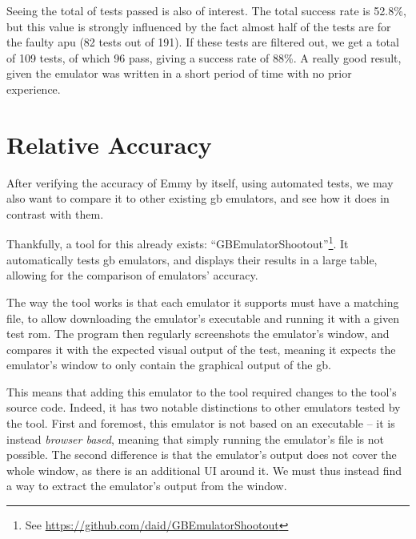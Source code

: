 \documentclass[11pt]{informatics-report}
\newcommand{\ftnt}[1]{\footnote{See \url{#1}}}
\begin{document}
Seeing the total of tests passed is also of interest. The total success rate is 52.8\%, but this value is strongly influenced by the fact almost half of the tests are for the faulty \gls{apu} (82 tests out of 191). If these tests are filtered out, we get a total of 109 tests, of which 96 pass, giving a success rate of 88\%. A really good result, given the emulator was written in a short period of time with no prior experience.

\section{Relative Accuracy}

After verifying the accuracy of Emmy by itself, using automated tests, we may also want to compare it to other existing \gls{gb} emulators, and see how it does in contrast with them.

Thankfully, a tool for this already exists: ``GBEmulatorShootout''\ftnt{https://github.com/daid/GBEmulatorShootout}. It automatically tests \gls{gb} emulators, and displays their results in a large table, allowing for the comparison of emulators' accuracy.

The way the tool works is that each emulator it supports must have a matching file, to allow downloading the emulator's executable and running it with a given test \gls{rom}. The program then regularly screenshots the emulator's window, and compares it with the expected visual output of the test, meaning it expects the emulator's window to only contain the graphical output of the \gls{gb}.

This means that adding this emulator to the tool required changes to the tool's source code. Indeed, it has two notable distinctions to other emulators tested by the tool. First and foremost, this emulator is not based on an executable -- it is instead \textit{browser based}, meaning that simply running the emulator's file is not possible. The second difference is that the emulator's output does not cover the whole window, as there is an additional UI around it. We must thus instead find a way to extract the emulator's output from the window.
\end{document}
